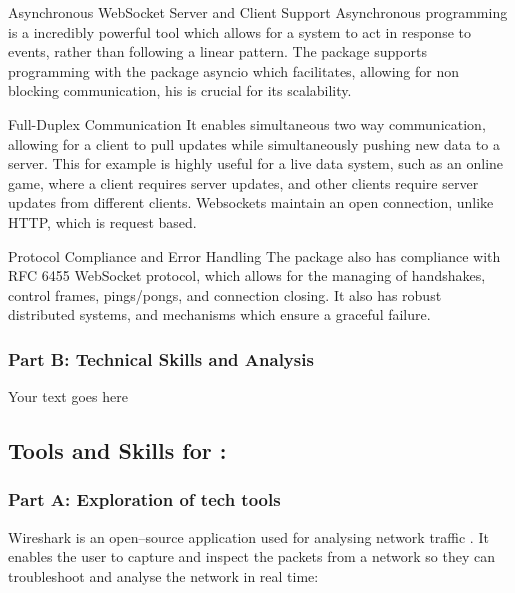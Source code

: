 \documentclass[a4paper, 11pt]{report}
\begin{document}
Asynchronous WebSocket Server and Client Support
Asynchronous programming is a incredibly powerful tool which allows for a system to act in response to events, rather than following a linear pattern. The package supports programming with the package asyncio which facilitates, allowing for non blocking communication, his is crucial for its scalability. 


Full-Duplex Communication
It enables simultaneous two way communication, allowing for a client to pull updates while simultaneously pushing new data to a server. This for example is highly useful for a live data system, such as an online game, where a client requires server updates, and other clients require server updates from different clients. Websockets maintain an open connection, unlike HTTP, which is request based. 


Protocol Compliance and Error Handling
The package also has compliance with RFC 6455 WebSocket protocol, which allows for the managing of handshakes, control frames, pings/pongs, and connection closing. It also has robust distributed systems, and mechanisms which ensure a graceful failure.


\subsubsection{Part B: Technical Skills and Analysis}

Your text goes here




\subsection{Tools and Skills for \majD: \studD}

\subsubsection{Part A: Exploration of tech tools}

Wireshark is an open–source application used for analysing network traffic \cite{soepeno2023}. It enables the user to capture and inspect the packets from a network so they can troubleshoot and analyse the network in real time:
\end{document}
